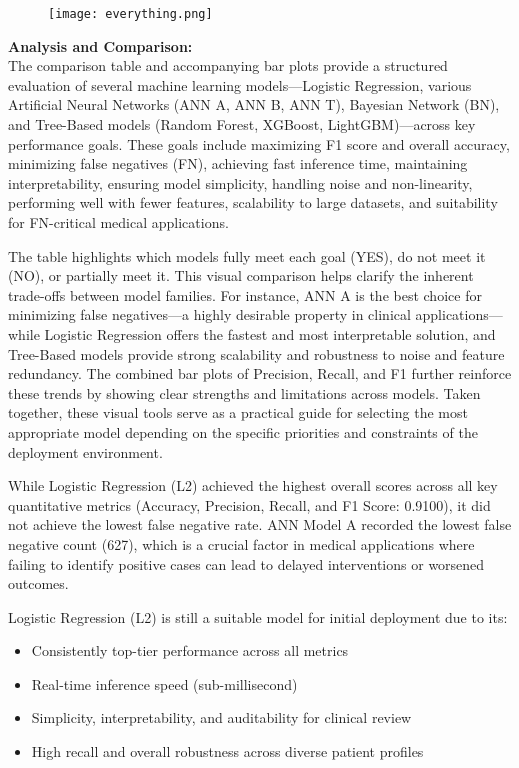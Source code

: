 \documentclass[conference]{IEEEtran}
\begin{document}
\clearpage


\begin{figure}[t]
  \centering
  \texttt{[image: everything.png]}
\end{figure}








\vspace{4em}
\noindent \textbf{Analysis and Comparison:}\\

The comparison table and accompanying bar plots provide a structured evaluation of several machine learning models—Logistic Regression, various Artificial Neural Networks (ANN A, ANN B, ANN T), Bayesian Network (BN), and Tree-Based models (Random Forest, XGBoost, LightGBM)—across key performance goals. These goals include maximizing F1 score and overall accuracy, minimizing false negatives (FN), achieving fast inference time, maintaining interpretability, ensuring model simplicity, handling noise and non-linearity, performing well with fewer features, scalability to large datasets, and suitability for FN-critical medical applications.

The table highlights which models fully meet each goal (YES), do not meet it (NO), or partially meet it. This visual comparison helps clarify the inherent trade-offs between model families. For instance, ANN A is the best choice for minimizing false negatives—a highly desirable property in clinical applications—while Logistic Regression offers the fastest and most interpretable solution, and Tree-Based models provide strong scalability and robustness to noise and feature redundancy. The combined bar plots of Precision, Recall, and F1 further reinforce these trends by showing clear strengths and limitations across models. Taken together, these visual tools serve as a practical guide for selecting the most appropriate model depending on the specific priorities and constraints of the deployment environment.

While Logistic Regression (L2) achieved the highest overall scores across all key quantitative metrics (Accuracy, Precision, Recall, and F1 Score: 0.9100), it did not achieve the lowest false negative rate. ANN Model A recorded the lowest false negative count (627), which is a crucial factor in medical applications where failing to identify positive cases can lead to delayed interventions or worsened outcomes.

Logistic Regression (L2) is still a suitable model for initial deployment due to its:
\begin{itemize}
\item Consistently top-tier performance across all metrics
\item Real-time inference speed (sub-millisecond)
\item Simplicity, interpretability, and auditability for clinical review
\item High recall and overall robustness across diverse patient profiles
\end{itemize}
\end{document}
